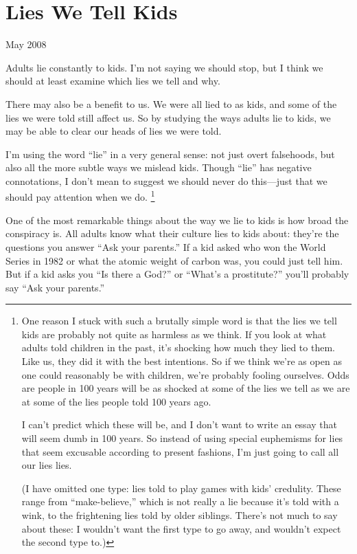 \chapter{Lies We Tell Kids}

May 2008

Adults lie constantly to kids. I'm not saying we should stop, but I
think we should at least examine which lies we tell and why.

There may also be a benefit to us. We were all lied to as kids, and some
of the lies we were told still affect us. So by studying the ways adults
lie to kids, we may be able to clear our heads of lies we were told.

I'm using the word ``lie'' in a very general sense: not just overt
falsehoods, but also all the more subtle ways we mislead kids. Though
``lie'' has negative connotations, I don't mean to suggest we should
never do this---just that we should pay attention when we do.
\footnote{One reason I stuck with such a brutally simple word is that the
lies we tell kids are probably not quite as harmless as we think. If you
look at what adults told children in the past, it's shocking how much
they lied to them. Like us, they did it with the best intentions. So if
we think we're as open as one could reasonably be with children, we're
probably fooling ourselves. Odds are people in 100 years will be as
shocked at some of the lies we tell as we are at some of the lies people
told 100 years ago.

I can't predict which these will be, and I don't want to write an essay
that will seem dumb in 100 years. So instead of using special euphemisms
for lies that seem excusable according to present fashions, I'm just
going to call all our lies lies.

(I have omitted one type: lies told to play games with kids' credulity.
These range from ``make-believe,'' which is not really a lie because
it's told with a wink, to the frightening lies told by older siblings.
There's not much to say about these: I wouldn't want the first type to
go away, and wouldn't expect the second type to.)}

One of the most remarkable things about the way we lie to kids is how
broad the conspiracy is. All adults know what their culture lies to kids
about: they're the questions you answer ``Ask your parents.'' If a kid
asked who won the World Series in 1982 or what the atomic weight of
carbon was, you could just tell him. But if a kid asks you ``Is there a
God?'' or ``What's a prostitute?'' you'll probably say ``Ask your
parents.''

